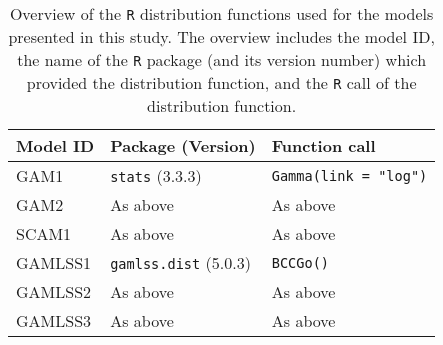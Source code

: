 \begin{table}[H]
  {\tabulinesep=2mm
    \begin{longtabu}{l l L}
      \caption{Overview of the \texttt{R} distribution functions used for the models presented in this study.  The overview includes
        the model ID,
        the name of the \texttt{R} package (and its version number) which provided the distribution function,
        and the \texttt{R} call of the distribution function.
        \label{tab:PresentedModelsOverview}} \\
      \toprule
      Model ID & Package (Version) & Function call \\
      \midrule
      \endhead
      \bottomrule
      \endlastfoot
      GAM1 & \texttt{stats} (3.3.3) & \texttt{Gamma(link = "log")} \\
      GAM2 & As above & As above \\
      SCAM1 & As above & As above \\
      GAMLSS1 & \texttt{gamlss.dist} (5.0.3) & \texttt{BCCGo()} \\
      GAMLSS2 & As above & As above \\
      GAMLSS3 & As above & As above \\
      \bottomrule
    \end{longtabu}}
\end{table}

